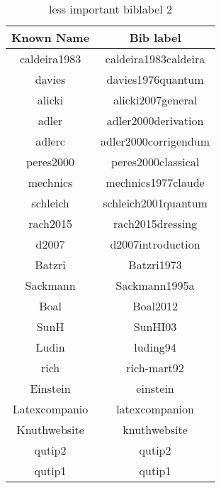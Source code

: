 \documentclass{article}
\begin{document}
\newpage
\begin{table}[h]
    \centering
    \begin{tabular}{c|c}
     Known Name & Bib label \\\hline
     caldeira1983 & caldeira1983caldeira\\
    davies  & davies1976quantum\\
    alicki  & alicki2007general\\
    adler  & adler2000derivation\\
    adlerc & adler2000corrigendum\\
    peres2000 & peres2000classical\\
    mechnics  & mechnics1977claude\\
    schleich  & schleich2001quantum\\
    rach2015 & rach2015dressing\\
    d2007 & d2007introduction\\
    Batzri  & Batzri1973\\
    Sackmann  & Sackmann1995a\\
    Boal  & Boal2012\\
    SunH & SunHI03\\
    Ludin & luding94\\
    rich  & rich-mart92\\
    Einstein & einstein\\
    Latexcompanio & latexcompanion\\
    Knuthwebsite & knuthwebsite\\
    qutip2 & qutip2\\
    qutip1 & qutip1   
    \end{tabular}
    \caption{less important biblabel 2}
    \label{tab:less important biblabel 2}
\end{table}


\newpage
\end{document}
